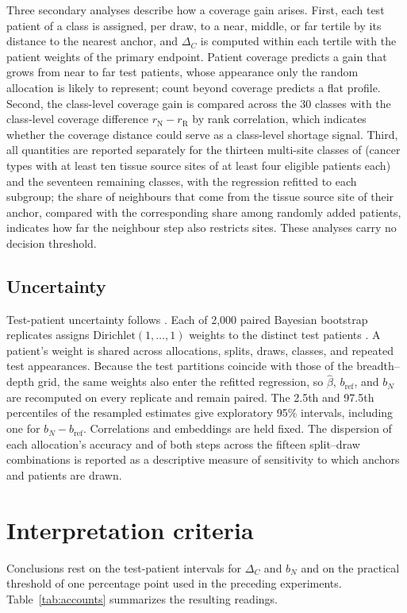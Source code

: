 \documentclass[11pt]{article}
\begin{document}
Three secondary analyses describe how a coverage gain arises. First, each test patient of a class is assigned, per draw, to a near, middle, or far tertile by its distance to the nearest anchor, and $\Delta_C$ is computed within each tertile with the patient weights of the primary endpoint. Patient coverage predicts a gain that grows from near to far test patients, whose appearance only the random allocation is likely to represent; count beyond coverage predicts a flat profile. Second, the class-level coverage gain is compared across the 30 classes with the class-level coverage difference $r_{\mathrm N}-r_{\mathrm R}$ by rank correlation, which indicates whether the coverage distance could serve as a class-level shortage signal. Third, all quantities are reported separately for the thirteen multi-site classes of \citet{queisler2026siteCoverage} (cancer types with at least ten tissue source sites of at least four eligible patients each) and the seventeen remaining classes, with the regression refitted to each subgroup; the share of neighbours that come from the tissue source site of their anchor, compared with the corresponding share among randomly added patients, indicates how far the neighbour step also restricts sites. These analyses carry no decision threshold.

\subsection{Uncertainty}
\label{sec:uncertainty}
Test-patient uncertainty follows \citet{queisler2026effectiveSupport}. Each of 2,000 paired Bayesian bootstrap replicates assigns $\mathrm{Dirichlet}(1,\ldots,1)$ weights to the distinct test patients \citep{rubin1981bayesian}. A patient's weight is shared across allocations, splits, draws, classes, and repeated test appearances. Because the test partitions coincide with those of the breadth--depth grid, the same weights also enter the refitted regression, so $\hat\beta$, $b_{\mathrm{ref}}$, and $b_N$ are recomputed on every replicate and remain paired. The 2.5th and 97.5th percentiles of the resampled estimates give exploratory 95\% intervals, including one for $b_N-b_{\mathrm{ref}}$. Correlations and embeddings are held fixed. The dispersion of each allocation's accuracy and of both steps across the fifteen split--draw combinations is reported as a descriptive measure of sensitivity to which anchors and patients are drawn.

\section{Interpretation criteria}
\label{sec:interpretation}
Conclusions rest on the test-patient intervals for $\Delta_C$ and $b_N$ and on the practical threshold of one percentage point used in the preceding experiments. Table~\ref{tab:accounts} summarizes the resulting readings.
\end{document}
